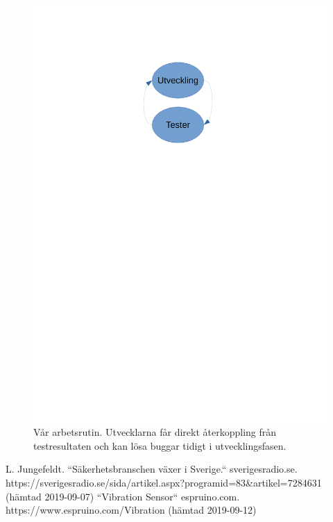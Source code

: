 \documentclass[a4paper]{article}
\begin{document}
\begin{figure}[h]
  \centering
  \includegraphics[trim={0 19cm 1cm 3cm}, clip, scale=0.5]{figurer/arbetsrutin.pdf}
  \caption{Vår arbetsrutin. Utvecklarna får direkt återkoppling från testresultaten och kan lösa buggar tidigt i utvecklingsfasen.}
\end{figure}

\newpage

\begin{thebibliography}{999}
\label{sec:referenser}
L. Jungefeldt. ``Säkerhetsbranschen växer i Sverige.`` sverigesradio.se.
https://sverigesradio.se/sida/artikel.aspx?programid=83\&artikel=7284631 (hämtad 2019-09-07)
``Vibration Sensor`` espruino.com.
https://www.espruino.com/Vibration (hämtad 2019-09-12)
\end{thebibliography}
\end{document}

